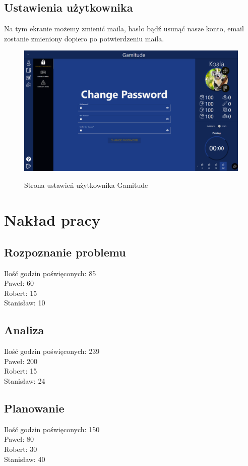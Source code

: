 \documentclass[a4paper,11pt]{report}
\begin{document}
\section{Ustawienia użytkownika}
Na tym ekranie możemy zmienić maila, hasło bądź usunąć nasze konto, email zostanie zmieniony dopiero po potwierdzeniu maila.
\begin{figure}[H]
	\centering
	\includegraphics[scale=0.3]{prezentacja/Settings}\\
	\caption{Strona ustawień użytkownika Gamitude}
	\label{fig:Settings}
\end{figure}

\chapter{Nakład pracy}
\section{Rozpoznanie problemu}
Ilość godzin poświęconych: 85\\
Paweł: 60\\
Robert: 15\\
Stanisław: 10\\

\section{Analiza}
Ilość godzin poświęconych: 239\\
Paweł: 200\\
Robert: 15\\
Stanisław:  24\\

\section{Planowanie}
Ilość godzin poświęconych: 150\\
Paweł: 80\\
Robert: 30\\
Stanisław: 40\\
\end{document}
